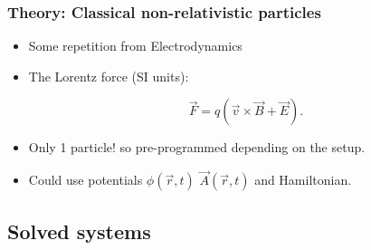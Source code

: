 \documentclass{beamer}
\begin{document}
\begin{frame}
\frametitle{Theory: Classical non-relativistic particles}
\begin{itemize}
\item<1-> Some repetition from Electrodynamics
\item<2-> The Lorentz force (SI units):

\begin{equation*}
\vec{F} = q ( \vec{v}\times \vec{B}+\vec{E}).
\end{equation*}

\item<3-> Only 1 particle! so pre-programmed depending on the setup.

\item<4-> Could use potentials $\phi(\vec{r},t)$ $\vec{A}(\vec{r},t)$ and Hamiltonian.
\end{itemize}
\end{frame}

\subsection{Solved systems}
\end{document}
